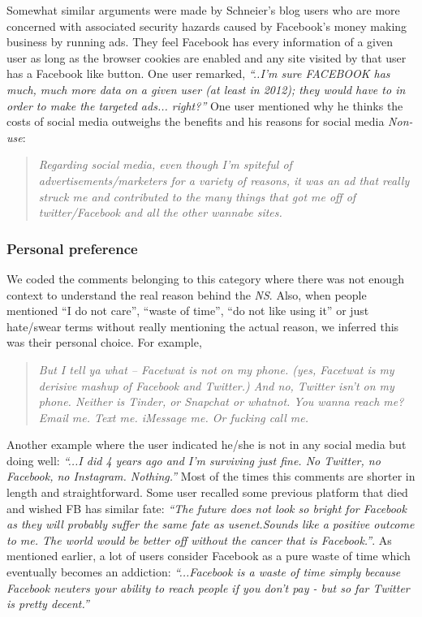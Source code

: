     Somewhat similar arguments were made by Schneier's blog users who are more concerned with associated security hazards caused by Facebook's money making business by running ads. They feel Facebook has every information of a given user as long as the browser cookies are enabled and any site visited by that user has a Facebook like button. One user remarked, \textit{``..I'm sure FACEBOOK has much, much more data on a given user (at least in 2012); they would have to in order to make the targeted ads... right?''} One user mentioned why he thinks the costs of social media outweighs the benefits and his reasons for social media \emph{Non-use}:
    \begin{quote}
         \textit{Regarding social media, even though I'm spiteful of advertisements/marketers for a variety of reasons, it was an ad that really struck me and contributed to the many things that got me off of twitter/Facebook and all the other wannabe sites.}
    \end{quote}
    
 \subsubsection{Personal preference}
 We coded the comments belonging to this category where there was not enough context to understand the real reason behind the \emph{NS}. Also, when people mentioned ``I do not care'', ``waste of time'', ``do not like using it'' or just hate/swear terms without really mentioning the actual reason, we inferred this was their personal choice. For example, 
     \begin{quote}
         \textit{But I tell ya what -- Facetwat is not on my phone. (yes, Facetwat is my derisive mashup of Facebook and Twitter.) And no, Twitter isn't on my phone. Neither is Tinder, or Snapchat or whatnot. You wanna reach me? Email me. Text me. iMessage me. Or fucking call me.}
     \end{quote}
     
     Another example where the user indicated he/she is not in any social media but doing well: \textit{``...I did 4 years ago and I'm surviving just fine. No Twitter, no Facebook, no Instagram. Nothing.''} Most of the times this comments are shorter in length and straightforward. Some user recalled some previous platform that died and wished FB has similar fate: \textit{``The future does not look so bright for Facebook as they will probably suffer the same fate as usenet.Sounds like a positive outcome to me. The world would be better off without the cancer that is Facebook.''}. As mentioned earlier, a lot of users consider Facebook as a pure waste of time which eventually becomes an addiction: \textit{``...Facebook is a waste of time simply because Facebook neuters your ability to reach people if you don't pay - but so far Twitter is pretty decent.''}
     

